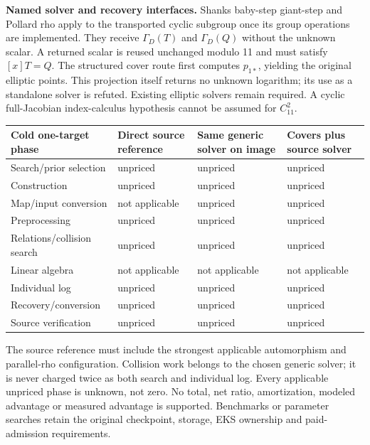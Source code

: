 \documentclass[10pt,a4paper]{article}
\begin{document}
\textbf{Named solver and recovery interfaces.} Shanks baby-step giant-step
and Pollard rho apply to the transported cyclic subgroup once its group
operations are implemented. They receive $\Gamma_D(T)$ and
$\Gamma_D(Q)$ without the unknown scalar. A returned scalar is reused
unchanged modulo 11 and must satisfy $[x]T=Q$. The structured cover route
first computes $p_{1*}$, yielding the original elliptic points. This
projection itself returns no unknown logarithm; its use as a standalone
solver is refuted. Existing elliptic solvers remain required. A cyclic
full-Jacobian index-calculus hypothesis cannot be assumed for $C_{11}^2$.

\begin{center}\small
\begin{tabular}{p{39mm}p{35mm}p{35mm}p{35mm}}
\toprule
Cold one-target phase & Direct source reference & Same generic solver on image & Covers plus source solver\\
\midrule
Search/prior selection & unpriced & unpriced & unpriced\\
Construction & unpriced & unpriced & unpriced\\
Map/input conversion & not applicable & unpriced & unpriced\\
Preprocessing & unpriced & unpriced & unpriced\\
Relations/collision search & unpriced & unpriced & unpriced\\
Linear algebra & not applicable & not applicable & not applicable\\
Individual log & unpriced & unpriced & unpriced\\
Recovery/conversion & unpriced & unpriced & unpriced\\
Source verification & unpriced & unpriced & unpriced\\
\bottomrule
\end{tabular}\end{center}
The source reference must include the strongest applicable automorphism
and parallel-rho configuration. Collision work belongs to the chosen
generic solver; it is never charged twice as both search and individual
log. Every applicable unpriced phase is unknown, not zero. No total,
net ratio, amortization, modeled advantage or measured advantage is
supported. Benchmarks or parameter searches retain the original
checkpoint, storage, EKS ownership and paid-admission requirements.
\end{document}
